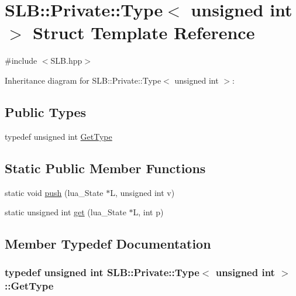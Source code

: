 \hypertarget{structSLB_1_1Private_1_1Type_3_01unsigned_01int_01_4}{}\section{S\+LB\+:\+:Private\+:\+:Type$<$ unsigned int $>$ Struct Template Reference}
\label{structSLB_1_1Private_1_1Type_3_01unsigned_01int_01_4}


{\ttfamily \#include $<$S\+L\+B.\+hpp$>$}



Inheritance diagram for S\+LB\+:\+:Private\+:\+:Type$<$ unsigned int $>$\+:
\subsection*{Public Types}
\begin{DoxyCompactItemize}
\item 
typedef unsigned int \hyperlink{structSLB_1_1Private_1_1Type_3_01unsigned_01int_01_4_a3e4d49d8fbabad94846e36fff3131483}{Get\+Type}
\end{DoxyCompactItemize}
\subsection*{Static Public Member Functions}
\begin{DoxyCompactItemize}
\item 
static void \hyperlink{structSLB_1_1Private_1_1Type_3_01unsigned_01int_01_4_a87784b8d9c710bcd1b8e471210a11068}{push} (lua\+\_\+\+State $\ast$L, unsigned int v)
\item 
static unsigned int \hyperlink{structSLB_1_1Private_1_1Type_3_01unsigned_01int_01_4_a0ba268564fc1859da8a9fe7777d2309b}{get} (lua\+\_\+\+State $\ast$L, int p)
\end{DoxyCompactItemize}


\subsection{Member Typedef Documentation}
\subsubsection[{\texorpdfstring{Get\+Type}{GetType}}]{\setlength{\rightskip}{0pt plus 5cm}typedef unsigned int {\bf S\+L\+B\+::\+Private\+::\+Type}$<$ unsigned int $>$\+::{\bf Get\+Type}}\hypertarget{structSLB_1_1Private_1_1Type_3_01unsigned_01int_01_4_a3e4d49d8fbabad94846e36fff3131483}{}\label{structSLB_1_1Private_1_1Type_3_01unsigned_01int_01_4_a3e4d49d8fbabad94846e36fff3131483}


